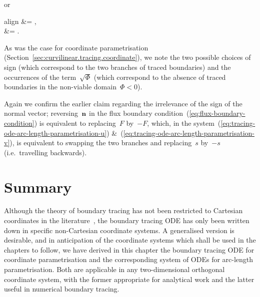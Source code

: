 or
\begin{important}{align}
   &= ,
    \label{eq:tracing-ode-arc-length-parametrisation-u} \\[\tallspace]
   &= .
    \label{eq:tracing-ode-arc-length-parametrisation-v}
\end{important}
As was the case for coordinate parametrisation
(Section~\ref{sec:curvilinear.tracing.coordinate}),
we note the two possible choices of sign
(which correspond to the two branches of traced boundaries)
and the occurrences of the term~$\sqrt{\Phi}$
(which correspond to the absence of traced boundaries
in the non-viable domain~$\Phi < 0$).

Again we confirm the earlier claim
regarding the irrelevance of the sign of the normal vector;
reversing~$\mathop{}\!\boldsymbol{\mathbf{n}}$
in the flux boundary condition~(\ref{eq:flux-boundary-condition})
is equivalent to replacing~$F$ by~$-F$,
which, in the system~(\ref{eq:tracing-ode-arc-length-parametrisation-u})
\&~(\ref{eq:tracing-ode-arc-length-parametrisation-v}),
is equivalent to swapping the two branches
and replacing~$s$ by~$-s$ (i.e.~travelling backwards).

\section{Summary}
\label{sec:curvilinear.summary}

Although the theory of boundary tracing
has not been restricted to Cartesian coordinates in the literature~\cite{
  anderson-2002-thesis-boundary-tracing-pdes,
  anderson-2007-boundary-tracing-i-theory,
  anderson-2007-boundary-tracing-ii-applications
},
the boundary tracing ODE has only been written down
in specific non-Cartesian coordinate systems.
A generalised version is desirable,
and in anticipation of the coordinate systems
which shall be used in the chapters to follow,
we have derived in this chapter
the boundary tracing ODE for coordinate parametrisation
and the corresponding system of ODEs for arc-length parametrisation.
Both are applicable in any two-dimensional orthogonal coordinate system,
with the former appropriate for analytical work
and the latter useful in numerical boundary tracing.
